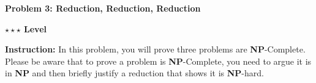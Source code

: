 \documentclass{article}\usepackage[utf8]{inputenc}\usepackage[margin=0.4cm,top=0.4cm,bottom=0.4cm]{geometry}\usepackage[usenames,dvipsnames,svgnames,table]{xcolor}
\begin{document}
\vspace{-2mm}\noindent\begin{mybox}{\begin{center}\textbf{\color{black}Problem 3: Reduction, Reduction, Reduction}\end{center}}\end{mybox}\vspace{-2mm}
\begin{myboxot}\noindent\textbf{$\star\star\star$ Level}\end{myboxot} 

\noindent \textbf{Instruction:} In this problem, you will prove three problems are \textbf{NP}-Complete. Please be aware that to prove a problem is \textbf{NP}-Complete, you need to argue it is in \textbf{NP} and then briefly justify a reduction that shows it is \textbf{NP}-hard.
\end{document}
